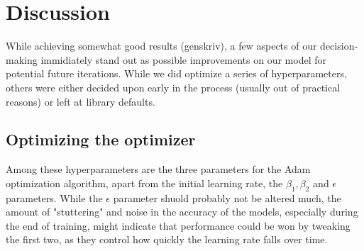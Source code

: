 \section{Discussion}
While achieving somewhat good results (genskriv), a few aspects of our decision-making immidiately stand out as possible improvements on our model for potential future iterations. While we did optimize a series of hyperparameters, others were either decided upon early in the process (usually out of practical reasons) or left at library defaults.
\subsection{Optimizing the optimizer}
Among these hyperparameters are the three parameters for the Adam optimization algorithm, apart from the initial learning rate, the $\beta_1, \beta_2$ and $\epsilon$ parameters. While the $\epsilon$ parameter shuold probably not be altered much, the amount of "stuttering" and noise in the accuracy of the models, especially during the end of training, might indicate that performance could be won by tweaking the first two, as they control how quickly the learning rate falls over time.
